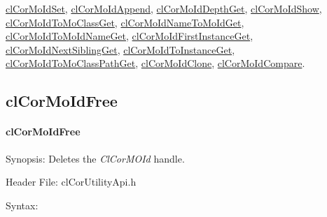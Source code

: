 \begin{flushleft}
\begin{Desc}
\hyperlink{pagecor116}{cl\-Cor\-MoId\-Set}, 
\hyperlink{pagecor117}{cl\-Cor\-MoId\-Append}, 
\hyperlink{pagecor118}{cl\-Cor\-MoId\-Depth\-Get}, 
\hyperlink{pagecor119}{cl\-Cor\-MoId\-Show}, 
\hyperlink{pagecor120}{cl\-Cor\-MoId\-To\-Mo\-Class\-Get}, 
\hyperlink{pagecor121}{cl\-Cor\-MoId\-Name\-To\-MoId\-Get}, 
\hyperlink{pagecor122}{cl\-Cor\-MoId\-To\-MoId\-Name\-Get}, 
\hyperlink{pagecor123}{cl\-Cor\-MoId\-First\-Instance\-Get},
\hyperlink{pagecor124}{cl\-Cor\-MoId\-Next\-Sibling\-Get}, 
\hyperlink{pagecor125}{cl\-Cor\-MoId\-To\-Instance\-Get}, 
\hyperlink{pagecor126}{cl\-Cor\-MoId\-To\-Mo\-Class\-Path\-Get}, 
\hyperlink{pagecor127}{cl\-Cor\-MoId\-Clone}, 
\hyperlink{pagecor128}{cl\-Cor\-MoId\-Compare}.\end{Desc}
\newpage


\subsection{clCorMoIdFree}
\hypertarget{pagecor114}{}\paragraph{cl\-Cor\-MoId\-Free}\label{pagecor114}
\begin{Desc}
\item[Synopsis:]Deletes the \textit{ClCorMOId} handle.\end{Desc}
\begin{Desc}
\item[Header File:]clCorUtilityApi.h\end{Desc}
\begin{Desc}
\item[Syntax:]


\end{Desc}
\end{flushleft}
